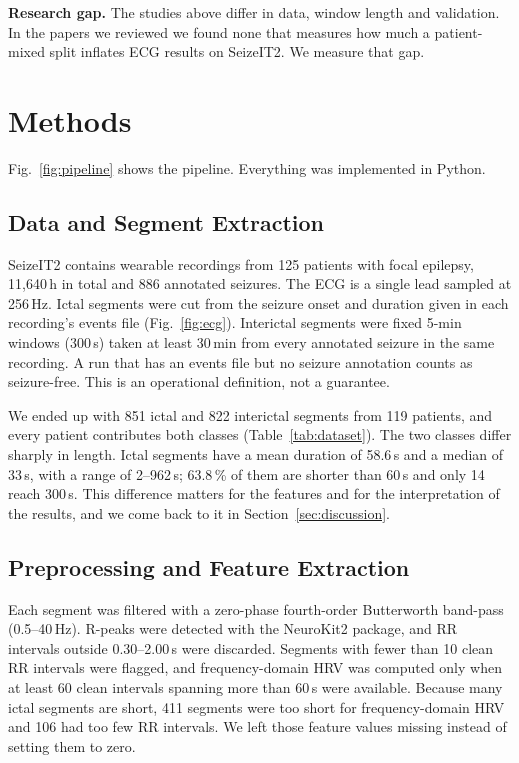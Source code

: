 \documentclass[conference,a4paper]{IEEEtran}
\begin{document}
\textbf{Research gap.} The studies above differ in data, window length and
validation. In the papers we reviewed we found none that measures how much a
patient-mixed split inflates ECG results on SeizeIT2. We measure that gap.

\section{Methods}\label{sec:methods}
Fig.~\ref{fig:pipeline} shows the pipeline. Everything was implemented in
Python.

\subsection{Data and Segment Extraction}
SeizeIT2 contains wearable recordings from 125 patients with focal epilepsy,
11,640\,h in total and 886 annotated seizures. The ECG is a single lead
sampled at 256\,Hz. Ictal segments were cut from the seizure onset and
duration given in each recording's events file (Fig.~\ref{fig:ecg}).
Interictal segments were fixed 5-min windows (300\,s) taken at least 30\,min
from every annotated seizure in the same recording. A run that has an events
file but no seizure annotation counts as seizure-free. This is an
operational definition, not a guarantee.

We ended up with 851 ictal and 822 interictal segments from 119 patients,
and every patient contributes both classes (Table~\ref{tab:dataset}). The
two classes differ sharply in length. Ictal segments have a mean duration of
58.6\,s and a median of 33\,s, with a range of 2--962\,s; 63.8\,\% of them
are shorter than 60\,s and only 14 reach 300\,s. This difference matters for
the features and for the interpretation of the results, and we come back to
it in Section~\ref{sec:discussion}.

\subsection{Preprocessing and Feature Extraction}
Each segment was filtered with a zero-phase fourth-order Butterworth
band-pass (0.5--40\,Hz). R-peaks were detected with the NeuroKit2 package,
and RR intervals outside 0.30--2.00\,s were discarded. Segments with fewer
than 10 clean RR intervals were flagged, and frequency-domain HRV was
computed only when at least 60 clean intervals spanning more than 60\,s were
available. Because many ictal segments are short, 411 segments were too
short for frequency-domain HRV and 106 had too few RR intervals. We left
those feature values missing instead of setting them to zero.
\end{document}
